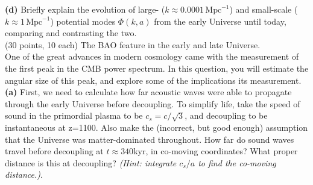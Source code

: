 \documentclass[12pt]{article}
\begin{document}
{\bf (d)} Briefly explain the evolution of large- ($k \approx 0.0001\,\mathrm{Mpc}^{-1}$)
and small-scale ($k \approx 1\,\mathrm{Mpc}^{-1}$) potential modes $\Phi(k,a)$ from the early 
Universe until today, comparing and contrasting the two.\\

%

 (30 points, 10 each) The BAO feature in the early and late Universe.\\

One of the great advances in modern cosmology came with the measurement of the first peak in the CMB power spectrum.
In this question, you will estimate the angular size of this peak, and explore some of the implications its measurement.\\

{\bf (a)} First, we need to calculate how far acoustic waves were able to propagate through the early Universe before decoupling.
To simplify life, take the speed of sound in the primordial plasma to be $c_s = c/\sqrt{3}$, and decoupling to be instantaneous at z=1100.
Also make the (incorrect, but good enough) assumption that the Universe was matter-dominated throughout.
How far do sound waves travel before decoupling at $t \approx 340$kyr, in co-moving coordinates?
What proper distance is this at decoupling? {\it (Hint: integrate $c_s/a$ to find the co-moving distance.)}.\\
\end{document}
